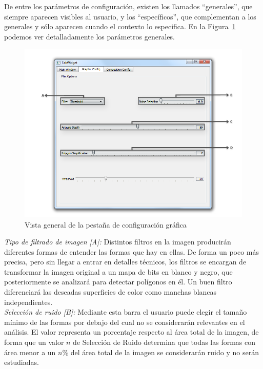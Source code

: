 		De entre los parámetros de configuración, existen los llamados ``generales'', que siempre aparecen visibles al usuario, y los ``específicos'', que complementan a los generales y sólo aparecen cuando el contexto lo especifica. En la Figura~\ref{fig:interfazgraphic} podemos ver detalladamente los parámetros generales.\\
		
		\begin{figure}[htbp]
		\centering
		\hspace*{-0.5in}
		\includegraphics[scale=0.5]{graphics/interfazgraphic.png}
		\caption{Vista general de la pestaña de configuración gráfica}
		\label{fig:interfazgraphic}
		\end{figure}
		
		\noindent\textit{Tipo de filtrado de imagen [A]:} Distintos filtros en la imagen producirán diferentes formas de entender las formas que hay en ellas. De forma un poco más precisa, pero sin llegar a entrar en detalles técnicos, los filtros se encargan de transformar la imagen original a un mapa de bits en blanco y negro, que posteriormente se analizará para detectar polígonos en él. Un buen filtro diferenciará las deseadas superficies de color como manchas blancas independientes.\\
		
		\noindent\textit{Selección de ruido [B]:} Mediante esta barra el usuario puede elegir el tamaño mínimo de las formas por debajo del cual no se considerarán relevantes en el análisis. El valor representa un porcentaje respecto al área total de la imagen, de forma que un valor $n$ de Selección de Ruido determina que todas las formas con área menor a un $n$\% del área total de la imagen se considerarán ruido y no serán estudiadas.\\
		
